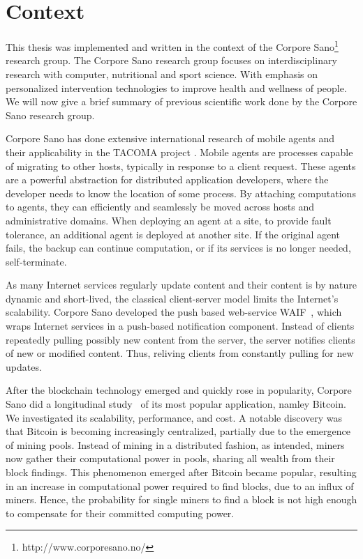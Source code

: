 \documentclass[USenglish]{uit-thesis}
\begin{document}
\section{Context}
This thesis was implemented and written in the context of the Corpore Sano\footnote{http://www.corporesano.no/} research group.
The Corpore Sano research group focuses on interdisciplinary research with computer, nutritional and sport science.
With emphasis on personalized intervention technologies to improve health and wellness of people.
We will now give a brief summary of previous scientific work done by the Corpore Sano research group.    



Corpore Sano has done extensive international research of mobile agents and their applicability in the TACOMA project \cite{mobile1, mobile2, mobile3}.
Mobile agents are processes capable of migrating to other hosts, typically in response to a client request.
These agents are a powerful abstraction for distributed application developers, where the developer needs to know the location of some process.
By attaching computations to agents, they can efficiently and seamlessly be moved across hosts and administrative domains.
When deploying an agent at a site, to provide fault tolerance, an additional agent is deployed at another site.
If the original agent fails, the backup can continue computation, or if its services is no longer needed, self-terminate.

As many Internet services regularly update content and their content is by nature dynamic and short-lived, the classical client-server model limits the Internet's scalability.
Corpore Sano developed the push based web-service WAIF~\cite{push1, push2}, which wraps Internet services in a push-based notification component.
Instead of clients repeatedly pulling possibly new content from the server, the server notifies clients of new or modified content.
Thus, reliving clients from constantly pulling for new updates.

After the blockchain technology emerged and quickly rose in popularity, Corpore Sano did a longitudinal study~\cite{teddy, teddy2} of its most popular application, namley Bitcoin.
We investigated its scalability, performance, and cost.
A notable discovery was that Bitcoin is becoming increasingly centralized, partially due to the emergence of mining pools.
Instead of mining in a distributed fashion, as intended, miners now gather their computational power in pools, sharing all wealth from their block findings.
This phenomenon emerged after Bitcoin became popular, resulting in an increase in computational power required to find blocks, due to an influx of miners.
Hence, the probability for single miners to find a block is not high enough to compensate for their committed computing power.
\end{document}

